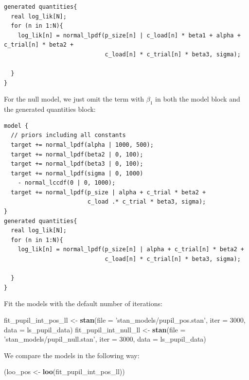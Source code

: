 \documentclass[12pt,]{krantz}
\newenvironment{Shaded}{\begin{snugshade}}{\end{snugshade}}
\newcommand{\KeywordTok}[1]{\textcolor[rgb]{0.13,0.29,0.53}{\textbf{#1}}}
\newcommand{\DataTypeTok}[1]{\textcolor[rgb]{0.13,0.29,0.53}{#1}}
\newcommand{\DecValTok}[1]{\textcolor[rgb]{0.00,0.00,0.81}{#1}}
\newcommand{\StringTok}[1]{\textcolor[rgb]{0.31,0.60,0.02}{#1}}
\newcommand{\NormalTok}[1]{#1}
\theoremstyle{definition}
\theoremstyle{definition}
\theoremstyle{definition}
\theoremstyle{remark}
\begin{document}
\begin{verbatim}
generated quantities{
  real log_lik[N];
  for (n in 1:N){
    log_lik[n] = normal_lpdf(p_size[n] | c_load[n] * beta1 + alpha + c_trial[n] * beta2 +
                             c_load[n] * c_trial[n] * beta3, sigma);

  }
}
\end{verbatim}

For the null model, we just omit the term with \(\beta_1\) in both the
model block and the generated quantities block:

\begin{verbatim}
model {
  // priors including all constants
  target += normal_lpdf(alpha | 1000, 500);
  target += normal_lpdf(beta2 | 0, 100);
  target += normal_lpdf(beta3 | 0, 100);
  target += normal_lpdf(sigma | 0, 1000)
    - normal_lccdf(0 | 0, 1000);
  target += normal_lpdf(p_size | alpha + c_trial * beta2 +
                        c_load .* c_trial * beta3, sigma);
}
generated quantities{
  real log_lik[N];
  for (n in 1:N){
    log_lik[n] = normal_lpdf(p_size[n] | alpha + c_trial[n] * beta2 +
                             c_load[n] * c_trial[n] * beta3, sigma);

  }
}
\end{verbatim}

Fit the models with the default number of iterations:

\begin{Shaded}
\begin{Highlighting}[]
\NormalTok{fit_pupil_int_pos_ll <-}\StringTok{ }\KeywordTok{stan}\NormalTok{(}\DataTypeTok{file =} \StringTok{'stan_models/pupil_pos.stan'}\NormalTok{,}
                             \DataTypeTok{iter =} \DecValTok{3000}\NormalTok{,}
                             \DataTypeTok{data =}\NormalTok{ ls_pupil_data)}
\NormalTok{fit_pupil_int_null_ll <-}\StringTok{ }\KeywordTok{stan}\NormalTok{(}\DataTypeTok{file =} \StringTok{'stan_models/pupil_null.stan'}\NormalTok{,}
                              \DataTypeTok{iter =} \DecValTok{3000}\NormalTok{,}
                              \DataTypeTok{data =}\NormalTok{ ls_pupil_data)}
\end{Highlighting}
\end{Shaded}

We compare the models in the following way:

\begin{Shaded}
\begin{Highlighting}[]
\NormalTok{(loo_pos <-}\StringTok{ }\KeywordTok{loo}\NormalTok{(fit_pupil_int_pos_ll))}
\end{Highlighting}
\end{Shaded}
\end{document}
